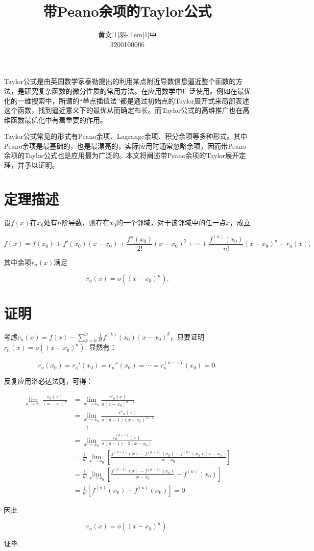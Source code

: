 \documentclass[UTF8]{ctexart}
\title{\textbf{带Peano余项的Taylor公式}}
\author{\CJKfamily{kai} 黄文\hbox{\scalebox{0.6}[1]{羽}\kern-.1em\scalebox{0.5}[1]{中}}\\3200100006}
\begin{document}
\maketitle

Taylor公式是由英国数学家泰勒提出的利用某点附近导数信息逼近整个函数的方法，是研究复杂函数的微分性质的常用方法。在应用数学中广泛使用。例如在最优化的一维搜索中，所谓的“单点插值法”都是通过初始点的Taylor展开式来局部表述这个函数，找到逼近意义下的最优从而确定布长。而Taylor公式的高维推广也在高维函数最优化中有着重要的作用。

Taylor公式常见的形式有Peano余项、Lagrange余项、积分余项等多种形式。其中Peano余项是最基础的，也是最漂亮的，实际应用时通常忽略余项，因而带Peano余项的Taylor公式也是应用最为广泛的。本文将阐述带Peano余项的Taylor展开定理，并予以证明。

\section{定理描述}

设$f(x)$在$x_0$处有$n$阶导数，则存在$x_0$的一个邻域，对于该邻域中的任一点$x$，成立

\begin{equation}
    f(x)=f(x_0)+f'(x_0)(x-x_0)+\frac{f''(x_0)}{2!}(x-x_0)^2+\cdots+\frac{f^{(n)}(x_0)}{n!}(x-x_0)^n+r_n(x),
\end{equation}

其中余项$r_n(x)$满足

\begin{equation}
    r_n(x)=o((x-x_0)^n).
\end{equation}

\section{证明}

考虑$r_n(x)=f(x)-\sum_{k=0}^n\frac{1}{k!}f^{(k)}(x_0)(x-x_0)^k$，只要证明$r_n(x)=o((x-x_0)^n)$. 显然有：

\begin{equation}
    r_n(x_0)=r_n'(x_0)=r_n''(x_0)=\cdots =r_n^(n-1)(x_0)=0.
\end{equation}

反复应用洛必达法则，可得：

\begin{align*}
   \lim_{x\to x_0} \frac{r_n(x)}{(x-x_0)^n} &= \lim_{x\to x_0} \frac{r'_n(x)}{n(x-x_0)^{n-1}}\\
   &= \lim_{x\to x_0} \frac{r''_n(x)}{n(n-1)(x-x_0)^{n-2}}\\
   & \qquad \vdots\\
   &= \lim_{x\to x_0} \frac{r^{(n-1)}_n(x)}{n(n-1)\cdots 2(x-x_0)} \\
   &= \frac{1}{n!}\lim_{x\to x_0} \left[\frac{f^{(n-1)}(x)-f^{(n-1)}(x_0)-f^{(n)}(x_0)(x-x_0)}{x-x_0}\right]\\
   &= \frac{1}{n!} \lim_{x\to x_0} \left[\frac{f^{(n-1)}(x)-f^{(n-1)}(x_0)}{x-x_0}-f^{(n)}(x_0)\right]\\
   &=\frac{1}{n!}\left[f^{(n)}(x_0)-f^{(n)}(x_0)\right]=0
\end{align*}

因此

\begin{equation*}
    r_n(x) = o((x-x_0)^n).
\end{equation*}

证毕.
\end{document}

